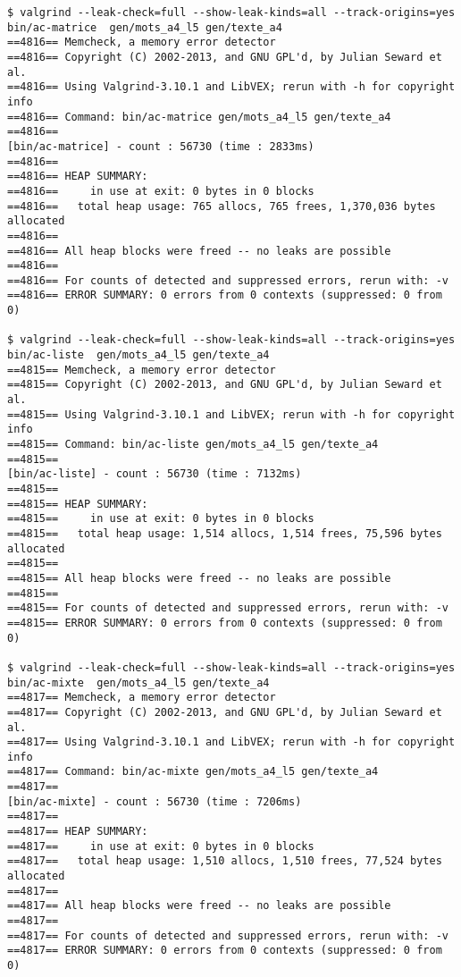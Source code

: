 \begin{verbatim}
$ valgrind --leak-check=full --show-leak-kinds=all --track-origins=yes
bin/ac-matrice  gen/mots_a4_l5 gen/texte_a4
==4816== Memcheck, a memory error detector
==4816== Copyright (C) 2002-2013, and GNU GPL'd, by Julian Seward et al.
==4816== Using Valgrind-3.10.1 and LibVEX; rerun with -h for copyright info
==4816== Command: bin/ac-matrice gen/mots_a4_l5 gen/texte_a4
==4816==
[bin/ac-matrice] - count : 56730 (time : 2833ms)
==4816==
==4816== HEAP SUMMARY:
==4816==     in use at exit: 0 bytes in 0 blocks
==4816==   total heap usage: 765 allocs, 765 frees, 1,370,036 bytes allocated
==4816==
==4816== All heap blocks were freed -- no leaks are possible
==4816==
==4816== For counts of detected and suppressed errors, rerun with: -v
==4816== ERROR SUMMARY: 0 errors from 0 contexts (suppressed: 0 from 0)

$ valgrind --leak-check=full --show-leak-kinds=all --track-origins=yes
bin/ac-liste  gen/mots_a4_l5 gen/texte_a4
==4815== Memcheck, a memory error detector
==4815== Copyright (C) 2002-2013, and GNU GPL'd, by Julian Seward et al.
==4815== Using Valgrind-3.10.1 and LibVEX; rerun with -h for copyright info
==4815== Command: bin/ac-liste gen/mots_a4_l5 gen/texte_a4
==4815==
[bin/ac-liste] - count : 56730 (time : 7132ms)
==4815==
==4815== HEAP SUMMARY:
==4815==     in use at exit: 0 bytes in 0 blocks
==4815==   total heap usage: 1,514 allocs, 1,514 frees, 75,596 bytes allocated
==4815==
==4815== All heap blocks were freed -- no leaks are possible
==4815==
==4815== For counts of detected and suppressed errors, rerun with: -v
==4815== ERROR SUMMARY: 0 errors from 0 contexts (suppressed: 0 from 0)

$ valgrind --leak-check=full --show-leak-kinds=all --track-origins=yes
bin/ac-mixte  gen/mots_a4_l5 gen/texte_a4
==4817== Memcheck, a memory error detector
==4817== Copyright (C) 2002-2013, and GNU GPL'd, by Julian Seward et al.
==4817== Using Valgrind-3.10.1 and LibVEX; rerun with -h for copyright info
==4817== Command: bin/ac-mixte gen/mots_a4_l5 gen/texte_a4
==4817==
[bin/ac-mixte] - count : 56730 (time : 7206ms)
==4817==
==4817== HEAP SUMMARY:
==4817==     in use at exit: 0 bytes in 0 blocks
==4817==   total heap usage: 1,510 allocs, 1,510 frees, 77,524 bytes allocated
==4817==
==4817== All heap blocks were freed -- no leaks are possible
==4817==
==4817== For counts of detected and suppressed errors, rerun with: -v
==4817== ERROR SUMMARY: 0 errors from 0 contexts (suppressed: 0 from 0)
\end{verbatim}

